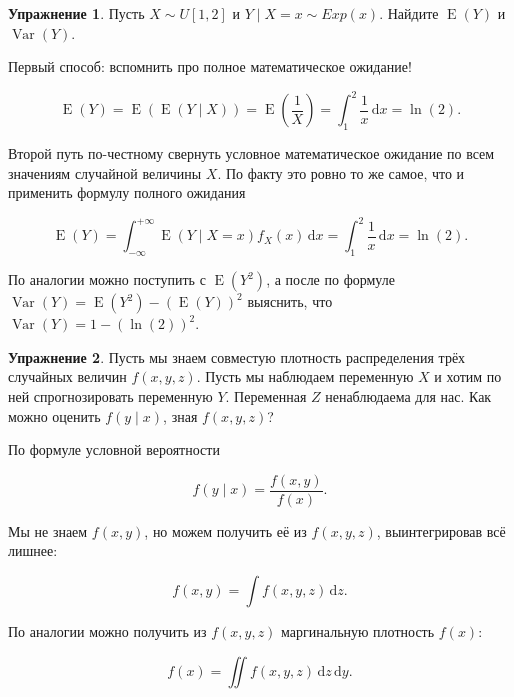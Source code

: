 \documentclass[12pt, a4paper, oneside]{extreport}
\DeclareMathOperator{\Var}{Var}
\DeclareMathOperator{\E}{\mathop{E}}
\newcommand{\dx}[1]{\,\mathrm{d}#1} %
\theoremstyle{plain}              %
\theoremstyle{definition}         %
\newtheorem{problem}{\color{myblue} Упражнение}
\begin{document}
\begin{problem}
Пусть $X \sim U[1,2]$ и  $Y \mid X=x \sim Exp(x)$. Найдите $\E(Y)$ и $\Var(Y)$. 

\begin{sol} 
Первый способ: вспомнить про полное математическое ожидание! 

\[ \E(Y) = \E(\E(Y \mid X)) = \E\left(\frac{1}{X}\right) = \int_1^2 \frac{1}{x} \dx{x} = \ln(2). \]

Второй путь по-честному свернуть условное математическое ожидание по всем значениям случайной величины $X$. По факту это ровно то же самое, что и применить формулу полного ожидания

\[ \E(Y) = \int_{-\infty}^{+\infty} \E(Y \mid X = x) f_X(x) \dx{x} = \int_1^2 \frac{1}{x} \dx{x} = \ln(2).\]

По аналогии можно поступить с $\E(Y^2)$, а после по формуле $\Var(Y) = \E(Y^2) - (\E(Y))^2$ выяснить, что $\Var(Y) = 1 - (\ln(2))^2$.
\end{sol} 
\end{problem}


\begin{problem} 
Пусть мы знаем совместую плотность распределения трёх случайных величин  $f(x,y,z)$.  Пусть мы наблюдаем переменную $X$ и хотим по ней спрогнозировать переменную $Y$. Переменная $Z$ ненаблюдаема для нас. Как можно оценить $f(y \mid x)$, зная $f(x,y,z)$? 

\begin{sol}
По формуле условной вероятности 

\[f(y \mid x) = \frac{f(x,y)}{f(x)}.\]

Мы не знаем $f(x,y)$, но можем получить её из $f(x,y,z)$, выинтегрировав всё лишнее: 

\[ f(x,y) = \int f(x,y,z) \dx{z}. \]

По аналогии можно получить из $f(x,y,z)$ маргинальную плотность $f(x)$: 

\[ f(x) = \iint f(x,y,z) \dx{z}\dx{y}. \]
\end{sol}
\end{problem}
\end{document}
